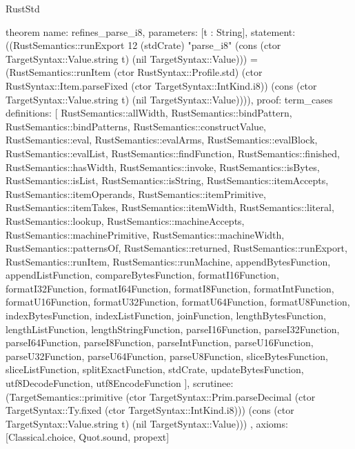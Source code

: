 \begin{lexlean}{RustStd}
\begin{semanticmodule}
theorem{
  name: refines_parse_i8,
  parameters: [t : String],
  statement: ((RustSemantics::runExport 12 (stdCrate) "parse_i8" (cons (ctor TargetSyntax::Value.string t) (nil TargetSyntax::Value))) = (RustSemantics::runItem (ctor RustSyntax::Profile.std) (ctor RustSyntax::Item.parseFixed (ctor TargetSyntax::IntKind.i8)) (cons (ctor TargetSyntax::Value.string t) (nil TargetSyntax::Value)))),
  proof: term_cases{
    definitions: [
      RustSemantics::allWidth,
      RustSemantics::bindPattern,
      RustSemantics::bindPatterns,
      RustSemantics::constructValue,
      RustSemantics::eval,
      RustSemantics::evalArms,
      RustSemantics::evalBlock,
      RustSemantics::evalList,
      RustSemantics::findFunction,
      RustSemantics::finished,
      RustSemantics::hasWidth,
      RustSemantics::invoke,
      RustSemantics::isBytes,
      RustSemantics::isList,
      RustSemantics::isString,
      RustSemantics::itemAccepts,
      RustSemantics::itemOperands,
      RustSemantics::itemPrimitive,
      RustSemantics::itemTakes,
      RustSemantics::itemWidth,
      RustSemantics::literal,
      RustSemantics::lookup,
      RustSemantics::machineAccepts,
      RustSemantics::machinePrimitive,
      RustSemantics::machineWidth,
      RustSemantics::patternsOf,
      RustSemantics::returned,
      RustSemantics::runExport,
      RustSemantics::runItem,
      RustSemantics::runMachine,
      appendBytesFunction,
      appendListFunction,
      compareBytesFunction,
      formatI16Function,
      formatI32Function,
      formatI64Function,
      formatI8Function,
      formatIntFunction,
      formatU16Function,
      formatU32Function,
      formatU64Function,
      formatU8Function,
      indexBytesFunction,
      indexListFunction,
      joinFunction,
      lengthBytesFunction,
      lengthListFunction,
      lengthStringFunction,
      parseI16Function,
      parseI32Function,
      parseI64Function,
      parseI8Function,
      parseIntFunction,
      parseU16Function,
      parseU32Function,
      parseU64Function,
      parseU8Function,
      sliceBytesFunction,
      sliceListFunction,
      splitExactFunction,
      stdCrate,
      updateBytesFunction,
      utf8DecodeFunction,
      utf8EncodeFunction
    ],
    scrutinee: (TargetSemantics::primitive (ctor TargetSyntax::Prim.parseDecimal (ctor TargetSyntax::Ty.fixed (ctor TargetSyntax::IntKind.i8))) (cons (ctor TargetSyntax::Value.string t) (nil TargetSyntax::Value)))
  },
  axioms: [Classical.choice, Quot.sound, propext]
}


\end{semanticmodule}
\end{lexlean}
